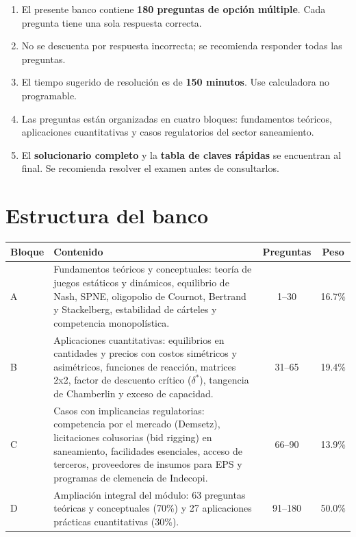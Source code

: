 \documentclass[11pt,a4paper]{article}
\begin{document}
\begin{enumerate}[label=\arabic*.,leftmargin=1.6em,itemsep=3pt]
  \item El presente banco contiene \textbf{180 preguntas de opción múltiple}. Cada pregunta tiene una sola respuesta correcta.
  \item No se descuenta por respuesta incorrecta; se recomienda responder todas las preguntas.
  \item El tiempo sugerido de resolución es de \textbf{150 minutos}. Use calculadora no programable.
  \item Las preguntas están organizadas en cuatro bloques: fundamentos teóricos, aplicaciones cuantitativas y casos regulatorios del sector saneamiento.
  \item El \textbf{solucionario completo} y la \textbf{tabla de claves rápidas} se encuentran al final. Se recomienda resolver el examen antes de consultarlos.
\end{enumerate}

\section*{Estructura del banco}

\begin{center}
\renewcommand{\arraystretch}{1.25}
\begin{tabular}{@{}p{1.4cm}>{\raggedright\arraybackslash}p{7.6cm}cc@{}}
\toprule
\textbf{Bloque} & \textbf{Contenido} & \textbf{Preguntas} & \textbf{Peso} \\
\midrule
A & Fundamentos teóricos y conceptuales: teoría de juegos estáticos y dinámicos, equilibrio de Nash, SPNE, oligopolio de Cournot, Bertrand y Stackelberg, estabilidad de cárteles y competencia monopolística. & 1--30 & 16.7\% \\
B & Aplicaciones cuantitativas: equilibrios en cantidades y precios con costos simétricos y asimétricos, funciones de reacción, matrices 2x2, factor de descuento crítico ($\delta^*$), tangencia de Chamberlin y exceso de capacidad. & 31--65 & 19.4\% \\
C & Casos con implicancias regulatorias: competencia por el mercado (Demsetz), licitaciones colusorias (bid rigging) en saneamiento, facilidades esenciales, acceso de terceros, proveedores de insumos para EPS y programas de clemencia de Indecopi. & 66--90 & 13.9\% \\
D & Ampliación integral del módulo: 63 preguntas teóricas y conceptuales (70\%) y 27 aplicaciones prácticas cuantitativas (30\%). & 91--180 & 50.0\% \\
\bottomrule
\end{tabular}
\end{center}
\end{document}
